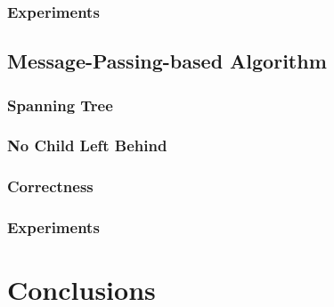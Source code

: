\documentclass[10pt]{beamer}
\begin{document}




\subsubsection[Algorithm2: Simulation]{Experiments}









\subsection[Algorithm3]{Message-Passing-based Algorithm}



\subsubsection[Algorithm3: Spanning Tree]{Spanning Tree}



\subsubsection[Algorithm3: Motion Strategy]{No Child Left Behind}



\subsubsection[Algorithm3: Correctness]{Correctness}



\subsubsection[Algorithm3: Simulation]{Experiments}

















\section{Conclusions}



\end{document}
